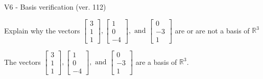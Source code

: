 \begin{exercise}
  \begin{exerciseTitle}V6 - Basis verification (ver. 112)\end{exerciseTitle}
  \begin{exerciseStatement}
    Explain why the vectors \(\left[\begin{array}{r}
3 \\
1 \\
1
\end{array}\right] , \left[\begin{array}{r}
1 \\
0 \\
-4
\end{array}\right] , \text{ and } \left[\begin{array}{r}
0 \\
-3 \\
1
\end{array}\right]\) are or are not a basis of \(\mathbb{R}^3\)	


  \end{exerciseStatement}
  \begin{exerciseAnswer}
   The vectors \(\left[\begin{array}{r}
3 \\
1 \\
1
\end{array}\right] , \left[\begin{array}{r}
1 \\
0 \\
-4
\end{array}\right] , \text{ and } \left[\begin{array}{r}
0 \\
-3 \\
1
\end{array}\right]\) 
  	 are  a basis of \(\mathbb{R}^3\).
  


  \end{exerciseAnswer}
\end{exercise}
